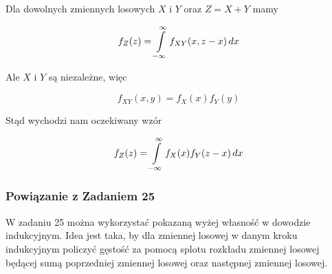 \documentclass{article}
\begin{document}
    Dla dowolnych zmiennych losowych $X$ i $Y$ oraz $Z = X + Y$ mamy

    \begin{equation}
        f_Z(z) = \int\displaylimits_{-\infty}^{\infty} f_{XY}(x,z-x) \,dx 
    \end{equation}

    Ale $X$ i $Y$ są niezależne, więc

    \begin{equation}
        f_{XY}(x,y)=f_X(x)f_Y(y)
    \end{equation}

    Stąd wychodzi nam oczekiwany wzór

    \begin{equation}
        f_Z(z) = \int\displaylimits_{-\infty}^{\infty} f_X(x)f_Y(z-x) \,dx 
    \end{equation}


    \subsubsection{Powiązanie z Zadaniem 25}

    W zadaniu 25 można wykorzystać pokazaną wyżej własność w dowodzie indukcyjnym. Idea jest taka, by dla zmiennej losowej w danym kroku indukcyjnym 
    policzyć gęstość za pomocą splotu rozkładu zmiennej losowej będącej sumą poprzedniej zmiennej losowej oraz następnej zmiennej losowej.

    
\end{document}
